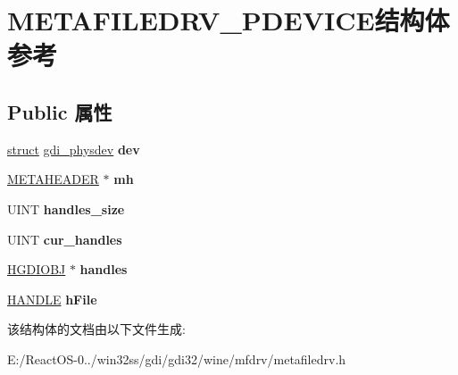 \hypertarget{struct_m_e_t_a_f_i_l_e_d_r_v___p_d_e_v_i_c_e}{}\section{M\+E\+T\+A\+F\+I\+L\+E\+D\+R\+V\+\_\+\+P\+D\+E\+V\+I\+C\+E结构体 参考}
\label{struct_m_e_t_a_f_i_l_e_d_r_v___p_d_e_v_i_c_e}
\subsection*{Public 属性}
\begin{DoxyCompactItemize}
\item 
\mbox{\label{struct_m_e_t_a_f_i_l_e_d_r_v___p_d_e_v_i_c_e_a9baac1439998dbc0219c756c87099b38}} 
\hyperlink{interfacestruct}{struct} \hyperlink{structgdi__physdev}{gdi\+\_\+physdev} {\bfseries dev}
\item 
\mbox{\label{struct_m_e_t_a_f_i_l_e_d_r_v___p_d_e_v_i_c_e_abc23aa9e840035dc5e9286931c391b9e}} 
\hyperlink{structtag_m_e_t_a_h_e_a_d_e_r}{M\+E\+T\+A\+H\+E\+A\+D\+ER} $\ast$ {\bfseries mh}
\item 
\mbox{\label{struct_m_e_t_a_f_i_l_e_d_r_v___p_d_e_v_i_c_e_af8fe8e7947aa5d6b9c5a8ac5a91aa76e}} 
U\+I\+NT {\bfseries handles\+\_\+size}
\item 
\mbox{\label{struct_m_e_t_a_f_i_l_e_d_r_v___p_d_e_v_i_c_e_a6a2fbb701b7d26f3f6699af430aab8ea}} 
U\+I\+NT {\bfseries cur\+\_\+handles}
\item 
\mbox{\label{struct_m_e_t_a_f_i_l_e_d_r_v___p_d_e_v_i_c_e_ae278eb98ab70e03accb8cc78cfe5bb08}} 
\hyperlink{interfacevoid}{H\+G\+D\+I\+O\+BJ} $\ast$ {\bfseries handles}
\item 
\mbox{\label{struct_m_e_t_a_f_i_l_e_d_r_v___p_d_e_v_i_c_e_a88b4bec2684098ecec6625212587d389}} 
\hyperlink{interfacevoid}{H\+A\+N\+D\+LE} {\bfseries h\+File}
\end{DoxyCompactItemize}


该结构体的文档由以下文件生成\+:\begin{DoxyCompactItemize}
\item 
E\+:/\+React\+O\+S-\/0../win32ss/gdi/gdi32/wine/mfdrv/metafiledrv.\+h\end{DoxyCompactItemize}
